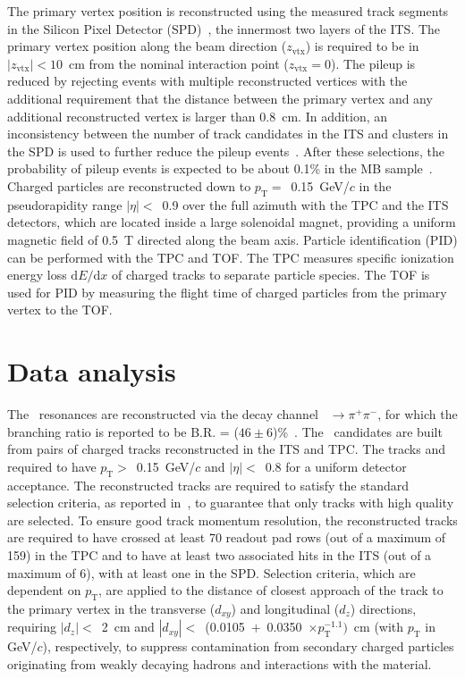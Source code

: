 The primary vertex position is reconstructed using the measured track segments in the Silicon Pixel Detector (SPD)~\cite{Santoro2009:ALICESPD}, the innermost two layers of the ITS. The primary vertex position along the beam direction ($z_\mathrm{vtx}$) is required to be in $|z_\mathrm{vtx}|<10$~cm from the nominal interaction point ($z_\mathrm{vtx}=0$). The pileup is reduced by rejecting events with multiple reconstructed vertices with the additional requirement that the distance between the primary vertex and any additional reconstructed vertex is larger than 0.8~cm. In addition, an inconsistency between the number of track candidates in the ITS and clusters in the SPD is used to further reduce the pileup events~\cite{ALICE:2015olq}. After these selections, the probability of pileup events is expected to be about 0.1\% in the MB sample~\cite{ALICE:2017svf}. Charged particles are reconstructed down to $p_{\mathrm{T}}=$~0.15~GeV/$c$ in the pseudorapidity range $|\eta|<$~0.9 over the full azimuth with the TPC and the ITS detectors, which are located inside a large solenoidal magnet, providing a uniform magnetic field of 0.5~T directed along the beam axis. Particle identification (PID) can be performed with the TPC and TOF. The TPC measures specific ionization energy loss $\mathrm{d}E/\mathrm{d}x$ of charged tracks to separate particle species. The TOF is used for PID by measuring the flight time of charged particles from the primary vertex to the TOF.

\section{Data analysis}

The \fzero~resonances are reconstructed via the decay channel \fzero~$\rightarrow \pi^{+}\pi^{-}$, for which the branching ratio is reported to be B.R. = ($46\pm6$)\%~\cite{Stone:2013eaa}. The \fzero~candidates are built from pairs of charged tracks reconstructed in the ITS and TPC. The tracks and required to have $p_{\mathrm{T}}>$~0.15~GeV/$c$ and $|\eta|<$~0.8 for a uniform detector acceptance. The reconstructed tracks are required to satisfy the standard selection criteria, as reported in~\cite{ALICE:2022qnb}, to guarantee that only tracks with high quality are selected. To ensure good track momentum resolution, the reconstructed tracks are required to have crossed at least 70 readout pad rows (out of a maximum of 159) in the TPC and to have at least two associated hits in the ITS (out of a maximum of 6), with at least one in the SPD. Selection criteria, which are dependent on $p_{\mathrm{T}}$, are applied to the distance of closest approach of the track to the primary vertex in the transverse ($d_{xy}$) and longitudinal ($d_{z}$) directions, requiring $|d_{z}|<$~2~cm and $|d_{xy}|<$~(0.0105~$+$~0.0350~$\times p_{\mathrm{T}}^{-1.1})$~cm (with $p_{\mathrm{T}}$ in GeV/$c$), respectively, to suppress contamination from secondary charged particles originating from weakly decaying hadrons and interactions with the material.

